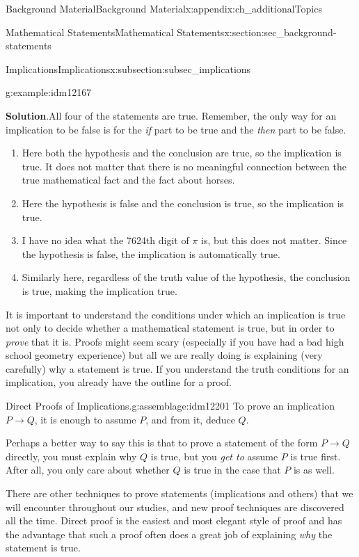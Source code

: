 \documentclass[oneside,10pt,]{book}
\numberwithin{equation}{chapter}
\def\imp{\rightarrow}
\begin{document}
\begin{appendixptx}{Background Material}{}{Background Material}{}{}{x:appendix:ch_additionalTopics}
\begin{sectionptx}{Mathematical Statements}{}{Mathematical Statements}{}{}{x:section:sec_background-statements}
\begin{subsectionptx}{Implications}{}{Implications}{}{}{x:subsection:subsec_implications}
\begin{example}{}{g:example:idm12167}
\begin{enumerate}
\end{enumerate}
%
\par\smallskip%
\noindent\textbf{Solution}.\hypertarget{g:solution:idm12185}{}\quad{}All four of the statements are true. Remember, the only way for an implication to be false is for the \emph{if} part to be true and the \emph{then} part to be false.%
\begin{enumerate}
\item{}Here both the hypothesis and the conclusion are true, so the implication is true. It does not matter that there is no meaningful connection between the true mathematical fact and the fact about horses.%
\item{}Here the hypothesis is false and the conclusion is true, so the implication is true.%
\item{}I have no idea what the 7624th digit of \(\pi\) is, but this does not matter. Since the hypothesis is false, the implication is automatically true.%
\item{}Similarly here, regardless of the truth value of the hypothesis, the conclusion is true, making the implication true.%
\end{enumerate}
%
\end{example}
It is important to understand the conditions under which an implication is true not only to decide whether a mathematical statement is true, but in order to \emph{prove} that it is. Proofs might seem scary (especially if you have had a bad high school geometry experience) but all we are really doing is explaining (very carefully) why a statement is true. If you understand the truth conditions for an implication, you already have the outline for a proof.%
\begin{assemblage}{Direct Proofs of Implications.}{g:assemblage:idm12201}%
To prove an implication \(P \imp Q\), it is enough to assume \(P\), and from it, deduce \(Q\).%
\end{assemblage}
Perhaps a better way to say this is that to prove a statement of the form \(P \imp Q\) directly, you must explain why \(Q\) is true, but you \emph{get to} assume \(P\) is true first.  After all, you only care about whether \(Q\) is true in the case that \(P\) is as well.%
\par
There are other techniques to prove statements (implications and others) that we will encounter throughout our studies, and new proof techniques are discovered all the time. Direct proof is the easiest and most elegant style of proof and has the advantage that such a proof often does a great job of explaining \emph{why} the statement is true.%

\end{subsectionptx}
\end{sectionptx}
\end{appendixptx}
\end{document}

